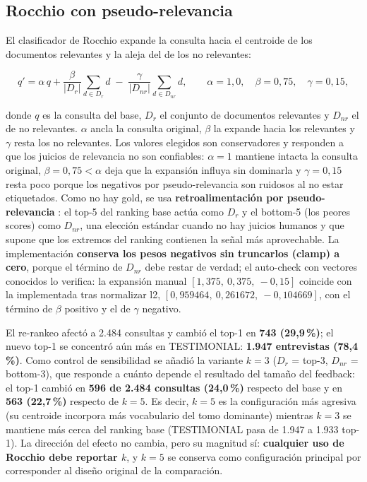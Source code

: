 \documentclass[11pt]{tg_usta}
\begin{document}
\subsection{Rocchio con pseudo-relevancia}

El clasificador de Rocchio \cite{rocchio1971relevance} expande la consulta hacia el centroide de los documentos relevantes y la aleja del de los no relevantes:

\begin{equation}\label{eq:rocchio}
q' = \alpha\, q + \frac{\beta}{|D_r|}\sum_{d\in D_r} d \;-\; \frac{\gamma}{|D_{nr}|}\sum_{d\in D_{nr}} d,
\qquad \alpha=1{,}0,\quad \beta=0{,}75,\quad \gamma=0{,}15,
\end{equation}

\noindent donde $q$ es la consulta del base, $D_r$ el conjunto de documentos relevantes y $D_{nr}$ el de no relevantes. $\alpha$ ancla la consulta original, $\beta$ la expande hacia los relevantes y $\gamma$ resta los no relevantes. Los valores elegidos son conservadores y responden a que los juicios de relevancia no son confiables: $\alpha=1$ mantiene intacta la consulta original, $\beta=0{,}75<\alpha$ deja que la expansión influya sin dominarla y $\gamma=0{,}15$ resta poco porque los negativos por pseudo-relevancia son ruidosos al no estar etiquetados. Como no hay gold, se usa \textbf{retroalimentación por pseudo-relevancia} \cite{manning2008introduction}: el top-5 del ranking base actúa como $D_r$ y el bottom-5 (los peores scores) como $D_{nr}$, una elección estándar cuando no hay juicios humanos y que supone que los extremos del ranking contienen la señal más aprovechable. La implementación \textbf{conserva los pesos negativos sin truncarlos (clamp) a cero}, porque el término de $D_{nr}$ debe restar de verdad; el auto-check con vectores conocidos lo verifica: la expansión manual $[1{,}375,\ 0{,}375,\ -0{,}15]$ coincide con la implementada tras normalizar l2, $[0{,}959464,\ 0{,}261672,\ -0{,}104669]$, con el término de $\beta$ positivo y el de $\gamma$ negativo.

El re-rankeo afectó a 2.484 consultas y cambió el top-1 en \textbf{743 (29,9\,\%)}; el nuevo top-1 se concentró aún más en TESTIMONIAL: \textbf{1.947 entrevistas (78,4\,\%)}. Como control de sensibilidad se añadió la variante $k=3$ ($D_r$ = top-3, $D_{nr}$ = bottom-3), que responde a cuánto depende el resultado del tamaño del feedback: el top-1 cambió en \textbf{596 de 2.484 consultas (24,0\,\%)} respecto del base y en \textbf{563 (22,7\,\%)} respecto de $k=5$. Es decir, $k=5$ es la configuración más agresiva (su centroide incorpora más vocabulario del tomo dominante) mientras $k=3$ se mantiene más cerca del ranking base (TESTIMONIAL pasa de 1.947 a 1.933 top-1). La dirección del efecto no cambia, pero su magnitud sí: \textbf{cualquier uso de Rocchio debe reportar $k$}, y $k=5$ se conserva como configuración principal por corresponder al diseño original de la comparación.
\end{document}
